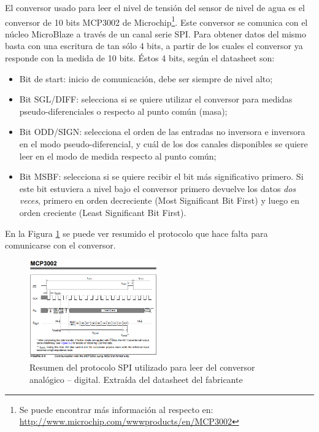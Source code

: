 \documentclass[conference,compsoc]{IEEEtran}
\begin{document}
		El conversor usado para leer el nivel de tensi\'on del sensor de nivel de agua es el conversor
		de 10 bits MCP3002 de Microchip\footnote{Se puede encontrar m\'as informaci\'on al respecto en:
		\url{http://www.microchip.com/wwwproducts/en/MCP3002}}. Este conversor se comunica con el
		n\'ucleo MicroBlaze a trav\'es de un canal serie SPI. Para obtener datos del mismo basta con una
		escritura de tan s\'olo 4 bits, a partir de los cuales el conversor ya responde con la medida de
		10 bits. \'Estos 4 bits, seg\'un el datasheet son:
		\begin{itemize}
			\item {Bit de start: inicio de comunicaci\'on, debe ser siempre de nivel alto;}
			\item {Bit SGL/DIFF: selecciona si se quiere utilizar el conversor para medidas pseudo-diferenciales o respecto al punto com\'un (masa);}
			\item {Bit ODD/SIGN: selecciona el orden de las entradas no inversora e inversora en el modo pseudo-diferencial, y cu\'al de los dos canales disponibles se quiere leer en el modo de medida respecto al punto com\'un;}
			\item {Bit MSBF: selecciona si se quiere recibir el bit m\'as significativo primero. Si este bit estuviera a nivel bajo el conversor primero devuelve los datos \emph{dos veces}, primero en orden decreciente (Most Significant Bit First) y luego en orden creciente (Least Significant Bit First).}
		\end{itemize}

		En la Figura \ref{fig:adc_spi} se puede ver resumido el protocolo que hace falta para
		comunicarse con el conversor.

		\begin{figure}[h!]
			\centering
			\includegraphics[width=0.49\textwidth]{./figuras/adc_spi.png}
			\caption{Resumen del protocolo SPI utilizado para leer del conversor anal\'ogico -- digital. Extra\'ida del datasheet del fabricante}
			\label{fig:adc_spi}
		\end{figure}
\end{document}
